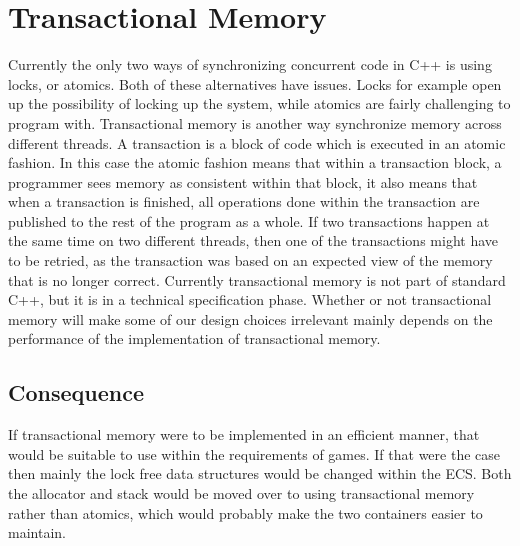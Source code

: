\section{Transactional Memory}
\label{subsec:longevity_transactional_memory}
Currently the only two ways of synchronizing concurrent code in C++
is using locks, or atomics. Both of these alternatives have issues.
Locks for example open up the possibility of locking up the system,
while atomics are fairly challenging to program with.
Transactional memory is another way synchronize memory across different threads.
A transaction is a block of code which is executed in an atomic fashion.
In this case the atomic fashion means that within a transaction block,
a programmer sees memory as consistent within that block,
it also means that when a transaction is finished, all operations done within
the transaction are published to the rest of the program as a whole.
If two transactions happen at the same time on two different threads,
then one of the transactions might have to be retried, as the transaction
was based on an expected view of the memory that is no longer correct\cite{brett_hall_transactional_memory_in_practice}.
Currently transactional memory is not part of standard C++, but it is
in a technical specification phase.
Whether or not transactional memory will make some of our design choices
irrelevant mainly depends on the performance of the implementation of transactional
memory.

\subsection{Consequence}
If transactional memory were to be implemented in an efficient manner, that would
be suitable to use within the requirements of games.
If that were the case then mainly the lock free data structures would be changed within
the ECS. Both the allocator and stack would be moved over to using transactional memory
rather than atomics, which would probably make the two containers easier to maintain.
